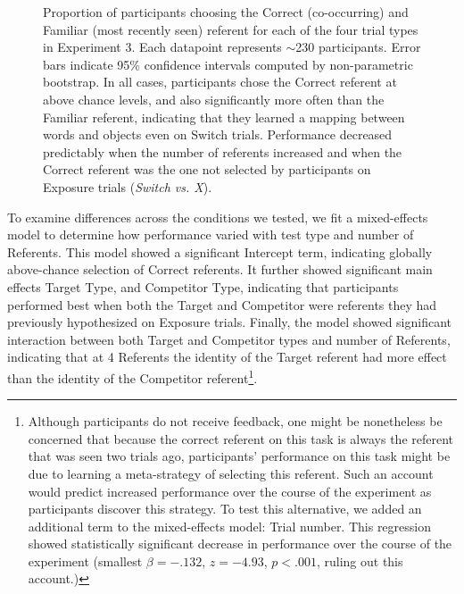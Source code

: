 \documentclass[man,floatsintext]{apa6}
\begin{document}
 \begin{figure}[tb]
	\caption{\label{fig:exp3_data} Proportion of participants choosing the Correct (co-occurring) and Familiar (most recently seen) referent for each of the four trial types in Experiment 3. Each datapoint represents $\sim$230 participants. Error bars indicate 95\% confidence intervals computed by non-parametric bootstrap. In all cases, participants chose the Correct referent at above chance levels, and also significantly more often than the Familiar referent, indicating that they learned a mapping between words and objects even on Switch trials. Performance decreased predictably when the number of referents increased and when the Correct referent was the one not selected by participants on Exposure trials (\emph{Switch vs. X}).}
\end{figure}

To examine differences across the conditions we tested, we fit a mixed-effects model to determine how performance varied with test type and number of Referents. This model showed a significant Intercept term, indicating globally above-chance selection of Correct referents. It further showed significant main effects Target Type, and Competitor Type, indicating that participants performed best when both the Target and Competitor were referents they had previously hypothesized on Exposure trials. Finally, the model showed significant interaction between both Target and Competitor types and number of Referents, indicating that at 4 Referents the identity of the Target referent had more effect than the identity of the Competitor referent\footnote{Although participants do not receive feedback, one might be nonetheless be concerned that because the correct referent on this task is always the referent that was seen two trials ago, participants' performance on this task might be due to learning a meta-strategy of selecting this referent. Such an account would predict increased performance over the course of the experiment as participants discover this strategy. To test this alternative, we added an additional term to the mixed-effects model: Trial number. This regression showed statistically significant decrease in performance over the course of the experiment (smallest $\beta =  -.132$, $z=-4.93$, $p< .001$, ruling out this account.)}.
\end{document}
